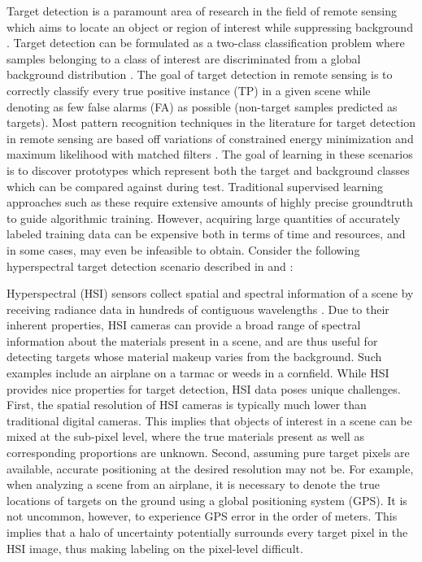 Target detection is a paramount area of research in the field of remote sensing which aims to locate an object or region of interest while suppressing background \cite{Geng2017TargetDetection,Chaudhuri1995TargetDetection}.  Target detection can be formulated as a two-class classification problem where samples belonging to a class of interest are discriminated from a global background distribution \cite{Zare2016MIACE}.  The goal of target detection in remote sensing is to correctly classify every true positive instance (TP) in a given scene while denoting as few false alarms (FA) as possible (non-target samples predicted as targets).  Most pattern recognition techniques in the literature for target detection in remote sensing are based off variations of constrained energy minimization and maximum likelihood with matched filters \cite{Geng2017TargetDetection,Chaudhuri1995TargetDetection}. The goal of learning in these scenarios is to discover prototypes which represent both the target and background classes which can be compared against during test.  Traditional supervised learning approaches such as these require extensive amounts of highly precise groundtruth to guide algorithmic training.  However, acquiring large quantities  of accurately labeled training data can be expensive both in terms of time and resources, and in some cases, may even be infeasible to obtain.  Consider the following hyperspectral target detection scenario described in \cite{Du2017Thesis} and \cite{Bocinsky2019Thesis}:  

Hyperspectral (HSI) sensors collect spatial and spectral information of a scene by receiving radiance data in hundreds of contiguous wavelengths \cite{Zare2008Thesis}.  Due to their inherent properties, HSI cameras can provide a broad range of spectral information about the materials present in a scene, and are thus useful for detecting targets whose material makeup varies from the background.  Such examples include an airplane on a tarmac or weeds in a cornfield.  While HSI provides nice properties for target detection, HSI data poses unique challenges.  First, the spatial resolution of HSI cameras is typically much lower than traditional digital cameras.  This implies that objects of interest in a scene can be mixed at the sub-pixel level, where the true materials present as well as corresponding proportions are unknown. Second, assuming pure target pixels are available, accurate positioning at the desired resolution may not be.  For example, when analyzing a scene from an airplane, it is necessary to denote the true locations of targets on the ground using a global positioning system (GPS). It is not uncommon, however, to experience GPS error in the order of meters.  This implies that a halo of uncertainty potentially surrounds every target pixel in the HSI image, thus making labeling on the pixel-level difficult.

